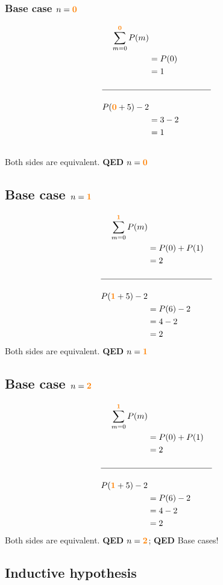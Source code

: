 \documentclass[11pt]{article}
\def \subsorange [#1]{\mathbf{\textcolor{orange}{#1}}}
\begin{document}
\begin{table}[h]
   \begin{subtable}[h]{0.45\textwidth}
      \subsubsection*{Base case $n=\subsorange[0]$}
      \begin{alignat*}{2}
         \sum_{m=0}^{\subsorange[0]}P(m) \\
         &=P(0) &\phantom{+P(1)} \\
         &=1 \\
         \\ \hline \\
         P(\subsorange[0]+5)-2 \\
         &=3-2 \\
         &=1 \\
         &\phantom{=1}
      \end{alignat*}
      Both sides are equivalent. \textbf{QED} $n=\subsorange[0]$
   \end{subtable}
   \hfill
   \begin{subtable}[h]{0.45\textwidth}
      \subsection*{Base case $n=\subsorange[1]$}
      \begin{alignat*}{2}
         \sum_{m=0}^{\subsorange[1]}P(m) \\
         &=P(0)+P(1) \\
         &=2 \\
         \\ \hline \\
         P(\subsorange[1]+5)-2 \\
         &=P(6)-2 \\
         &=4-2 \\
         &=2
      \end{alignat*}
      Both sides are equivalent. \textbf{QED} $n=\subsorange[1]$
    \end{subtable}
\end{table}

\subsection*{Base case $n=\subsorange[2]$}
\begin{alignat*}{2}
   \sum_{m=0}^{\subsorange[1]}P(m) \\
   &=P(0)+P(1) \\
   &=2 \\
   \\ \hline \\
   P(\subsorange[1]+5)-2 \\
   &=P(6)-2 \\
   &=4-2 \\
   &=2
\end{alignat*}
Both sides are equivalent. \textbf{QED} $n=\subsorange[2]$; \textbf{QED} Base cases!

\subsection*{Inductive hypothesis}
\end{document}
